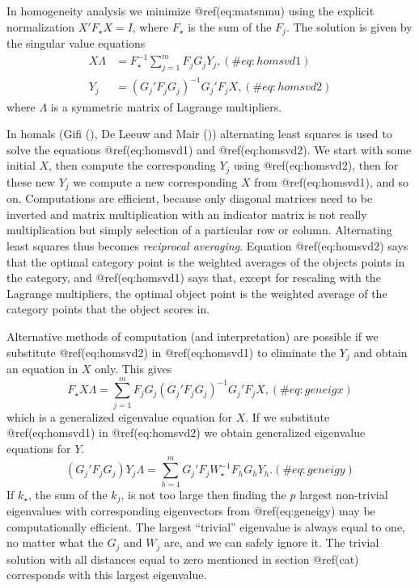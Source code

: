 \documentclass[
  12pt,
  letterpaper,
  DIV=11,
  numbers=noendperiod]{scrartcl}
\begin{document}
In homogeneity analysis we minimize @ref(eq:matsnmu) using the explicit
normalization \(X'F_\star X=I\), where \(F_\star\) is the sum of the
\(F_j\). The solution is given by the singular value equations
\begin{subequations}
\begin{align}
X\Lambda&=F_\star^{-1}\sum_{j=1}^m F_jG_jY_j,(\#eq:homsvd1)\\
Y_j&=(G_j'F_jG_j)^{-1}G_j'F_jX,(\#eq:homsvd2)
\end{align}
\end{subequations} where \(\Lambda\) is a symmetric matrix of Lagrange
multipliers.

In homals (Gifi (), De Leeuw and Mair
()) alternating least squares is
used to solve the equations @ref(eq:homsvd1) and @ref(eq:homsvd2). We
start with some initial \(X\), then compute the corresponding \(Y_j\)
using @ref(eq:homsvd2), then for these new \(Y_j\) we compute a new
corresponding \(X\) from @ref(eq:homsvd1), and so on. Computations are
efficient, because only diagonal matrices need to be inverted and matrix
multiplication with an indicator matrix is not really multiplication but
simply selection of a particular row or column. Alternating least
squares thus becomes \emph{reciprocal averaging}. Equation
@ref(eq:homsvd2) says that the optimal category point is the weighted
averages of the objects points in the category, and @ref(eq:homsvd1)
says that, except for rescaling with the Lagrange multipliers, the
optimal object point is the weighted average of the category points that
the object scores in.

Alternative methods of computation (and interpretation) are possible if
we substitute @ref(eq:homsvd2) in @ref(eq:homsvd1) to eliminate the
\(Y_j\) and obtain an equation in \(X\) only. This gives
\begin{equation}
F_\star X\Lambda=\sum_{j=1}^m F_jG_j(G_j'F_jG_j)^{-1}G_j'F_jX,
(\#eq:geneigx)
\end{equation} which is a generalized eigenvalue equation for \(X\). If
we substitute @ref(eq:homsvd1) in @ref(eq:homsvd2) we obtain generalized
eigenvalue equations for \(Y\). \begin{equation}
(G_j'F_jG_j)Y_j\Lambda=\sum_{h=1}^m G_j'F_jW_\star^{-1}F_hG_hY_h.
(\#eq:geneigy)
\end{equation} If \(k_\star\), the sum of the \(k_j\), is not too large
then finding the \(p\) largest non-trivial eigenvalues with
corresponding eigenvectors from @ref(eq:geneigy) may be computationally
efficient. The largest ``trivial'' eigenvalue is always equal to one, no
matter what the \(G_j\) and \(W_j\) are, and we can safely ignore it.
The trivial solution with all distances equal to zero mentioned in
section @ref(cat) corresponds with this largest eigenvalue.
\end{document}
